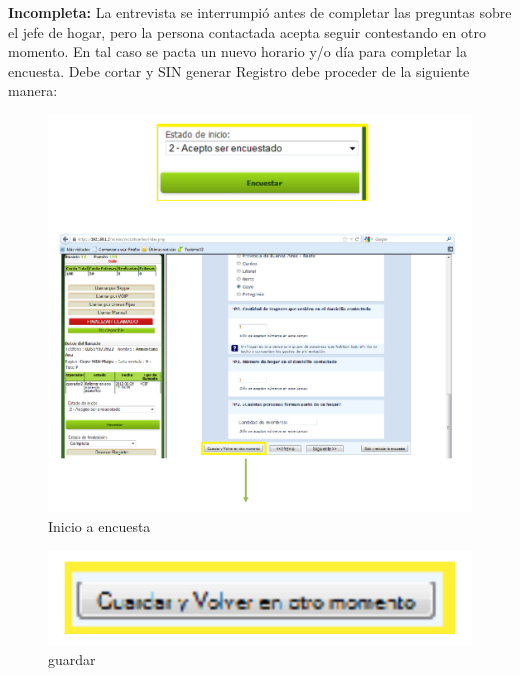 \documentclass[
  openany]{book}
\begin{document}
\textbf{Incompleta:} La entrevista se interrumpió antes de completar las preguntas sobre el jefe de hogar, pero la persona contactada acepta seguir contestando en otro momento. En tal caso se pacta un nuevo horario y/o día para completar la encuesta. Debe cortar y SIN generar Registro debe proceder de la siguiente manera:

\begin{figure}

{\centering \includegraphics[width=1\linewidth]{imagenes/figura6-31} 

}

\caption{Inicio a encuesta}\label{fig:enc}
\end{figure}

\begin{figure}

{\centering \includegraphics[width=1\linewidth]{imagenes/figura6-32} 

}

\caption{guardar}\label{fig:en6}
\end{figure}
\end{document}
